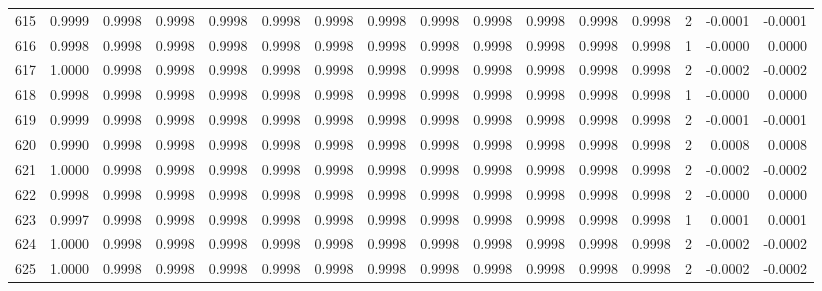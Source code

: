 \begin{tabular}{lrrrrrrrrrrrrrrr}
615 &      0.9999 &  0.9998 &  0.9998 &  0.9998 &  0.9998 &  0.9998 &  0.9998 &  0.9998 &  0.9998 &  0.9998 &   0.9998 &     0.9998 &      2 &                   -0.0001 &                    -0.0001 \\
616 &      0.9998 &  0.9998 &  0.9998 &  0.9998 &  0.9998 &  0.9998 &  0.9998 &  0.9998 &  0.9998 &  0.9998 &   0.9998 &     0.9998 &      1 &                   -0.0000 &                     0.0000 \\
617 &      1.0000 &  0.9998 &  0.9998 &  0.9998 &  0.9998 &  0.9998 &  0.9998 &  0.9998 &  0.9998 &  0.9998 &   0.9998 &     0.9998 &      2 &                   -0.0002 &                    -0.0002 \\
618 &      0.9998 &  0.9998 &  0.9998 &  0.9998 &  0.9998 &  0.9998 &  0.9998 &  0.9998 &  0.9998 &  0.9998 &   0.9998 &     0.9998 &      1 &                   -0.0000 &                     0.0000 \\
619 &      0.9999 &  0.9998 &  0.9998 &  0.9998 &  0.9998 &  0.9998 &  0.9998 &  0.9998 &  0.9998 &  0.9998 &   0.9998 &     0.9998 &      2 &                   -0.0001 &                    -0.0001 \\
620 &      0.9990 &  0.9998 &  0.9998 &  0.9998 &  0.9998 &  0.9998 &  0.9998 &  0.9998 &  0.9998 &  0.9998 &   0.9998 &     0.9998 &      2 &                    0.0008 &                     0.0008 \\
621 &      1.0000 &  0.9998 &  0.9998 &  0.9998 &  0.9998 &  0.9998 &  0.9998 &  0.9998 &  0.9998 &  0.9998 &   0.9998 &     0.9998 &      2 &                   -0.0002 &                    -0.0002 \\
622 &      0.9998 &  0.9998 &  0.9998 &  0.9998 &  0.9998 &  0.9998 &  0.9998 &  0.9998 &  0.9998 &  0.9998 &   0.9998 &     0.9998 &      2 &                   -0.0000 &                     0.0000 \\
623 &      0.9997 &  0.9998 &  0.9998 &  0.9998 &  0.9998 &  0.9998 &  0.9998 &  0.9998 &  0.9998 &  0.9998 &   0.9998 &     0.9998 &      1 &                    0.0001 &                     0.0001 \\
624 &      1.0000 &  0.9998 &  0.9998 &  0.9998 &  0.9998 &  0.9998 &  0.9998 &  0.9998 &  0.9998 &  0.9998 &   0.9998 &     0.9998 &      2 &                   -0.0002 &                    -0.0002 \\
625 &      1.0000 &  0.9998 &  0.9998 &  0.9998 &  0.9998 &  0.9998 &  0.9998 &  0.9998 &  0.9998 &  0.9998 &   0.9998 &     0.9998 &      2 &                   -0.0002 &                    -0.0002 \\

\end{tabular}
